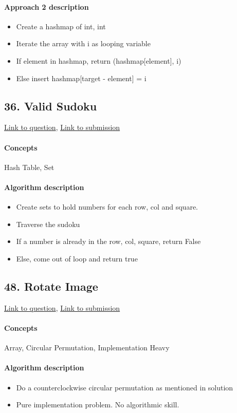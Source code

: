 \documentclass[11pt]{book}
\begin{document}
\paragraph{Approach 2 description}
\begin{itemize}
    \item Create a hashmap of int, int
    \item Iterate the array with i as looping variable
    \item If element in hashmap, return (hashmap[element], i)
    \item Else insert hashmap[target - element] = i
\end{itemize}

\subsection{36. Valid Sudoku}
\href{https://leetcode.com/problems/valid-sudoku/}{Link to question},
\href{https://leetcode.com/submissions/detail/333176948/}{Link to submission}
\paragraph{Concepts}
Hash Table, Set
\paragraph{Algorithm description}
\begin{itemize}
    \item Create sets to hold numbers for each row, col and square.
    \item Traverse the sudoku
    \item If a number is already in the row, col, square, return False
    \item Else, come out of loop and return true
\end{itemize}

\subsection{48. Rotate Image}
\href{https://leetcode.com/problems/rotate-image/}{Link to question},
\href{https://leetcode.com/submissions/detail/333188499/}{Link to submission}
\paragraph{Concepts}
Array, Circular Permutation, Implementation Heavy
\paragraph{Algorithm description}
\begin{itemize}
    \item Do a counterclockwise circular permutation as mentioned in solution
    \item Pure implementation problem. No algorithmic skill.
\end{itemize}
\end{document}
